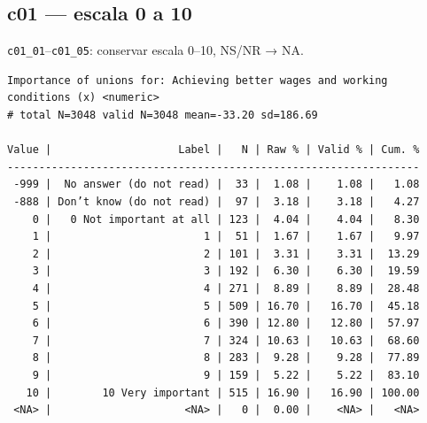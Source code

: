\documentclass[
  letterpaper,
  DIV=11,
  numbers=noendperiod]{scrreprt}
\newenvironment{Shaded}{\begin{snugshade}}{\end{snugshade}}
\newcommand{\FunctionTok}[1]{\textcolor[rgb]{0.28,0.35,0.67}{#1}}
\newcommand{\NormalTok}[1]{\textcolor[rgb]{0.00,0.23,0.31}{#1}}
\newcommand{\SpecialCharTok}[1]{\textcolor[rgb]{0.37,0.37,0.37}{#1}}
\begin{document}
\subsection{c01 --- escala 0 a 10}\label{c01-escala-0-a-10}

\texttt{c01\_01}--\texttt{c01\_05}: conservar escala 0--10, NS/NR → NA.

\begin{Shaded}
\end{Shaded}

\begin{verbatim}
Importance of unions for: Achieving better wages and working conditions (x) <numeric> 
# total N=3048 valid N=3048 mean=-33.20 sd=186.69

Value |                    Label |   N | Raw % | Valid % | Cum. %
-----------------------------------------------------------------
 -999 |  No answer (do not read) |  33 |  1.08 |    1.08 |   1.08
 -888 | Don’t know (do not read) |  97 |  3.18 |    3.18 |   4.27
    0 |   0 Not important at all | 123 |  4.04 |    4.04 |   8.30
    1 |                        1 |  51 |  1.67 |    1.67 |   9.97
    2 |                        2 | 101 |  3.31 |    3.31 |  13.29
    3 |                        3 | 192 |  6.30 |    6.30 |  19.59
    4 |                        4 | 271 |  8.89 |    8.89 |  28.48
    5 |                        5 | 509 | 16.70 |   16.70 |  45.18
    6 |                        6 | 390 | 12.80 |   12.80 |  57.97
    7 |                        7 | 324 | 10.63 |   10.63 |  68.60
    8 |                        8 | 283 |  9.28 |    9.28 |  77.89
    9 |                        9 | 159 |  5.22 |    5.22 |  83.10
   10 |        10 Very important | 515 | 16.90 |   16.90 | 100.00
 <NA> |                     <NA> |   0 |  0.00 |    <NA> |   <NA>
\end{verbatim}

\begin{Shaded}
\end{Shaded}
\end{document}
